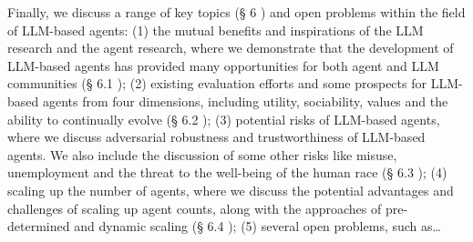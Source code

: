 \documentclass[11pt,a4paper,oneside]{memoir}
\begin{document}
\begin{tcolorbox}[origstyle]
\small Finally, we discuss a range of key topics (§ 6 ) and open problems within the field of LLM-based agents: (1) the mutual benefits and inspirations of the LLM research and the agent research, where we demonstrate that the development of LLM-based agents has provided many opportunities for both agent and LLM communities (§ 6.1 ); (2) existing evaluation efforts and some prospects for LLM-based agents from four dimensions, including utility, sociability, values and the ability to continually evolve (§ 6.2 ); (3) potential risks of LLM-based agents, where we discuss adversarial robustness and trustworthiness of LLM-based agents. We also include the discussion of some other risks like misuse, unemployment and the threat to the well-being of the human race (§ 6.3 ); (4) scaling up the number of agents, where we discuss the potential advantages and challenges of scaling up agent counts, along with the approaches of pre-determined and dynamic scaling (§ 6.4 ); (5) several open problems, such as\ldots
\end{tcolorbox}
\vspace{0.3em}
\end{document}

